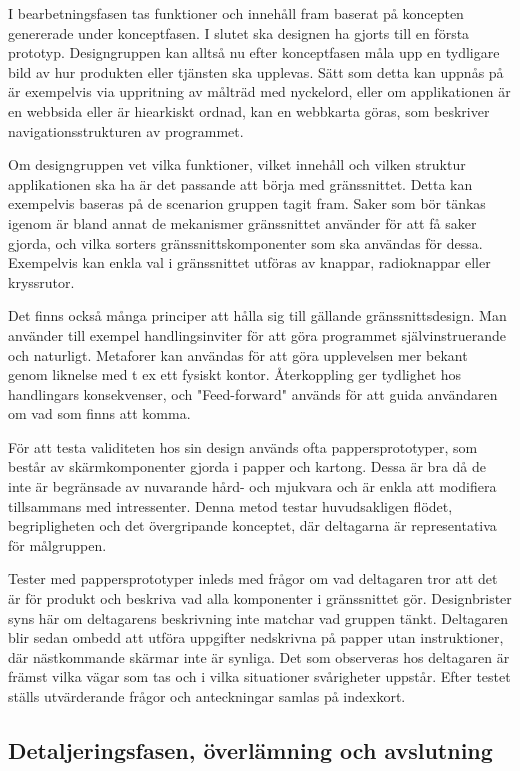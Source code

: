 \documentclass[a4paper,12pt,titlepage]{article}
\begin{document}
I bearbetningsfasen tas funktioner och innehåll fram baserat på koncepten genererade
under konceptfasen. I slutet ska designen ha gjorts till en första prototyp.
Designgruppen kan alltså nu efter konceptfasen måla upp en tydligare bild av
hur produkten eller tjänsten ska upplevas. Sätt som detta kan uppnås på är
exempelvis via uppritning av målträd med nyckelord, eller om applikationen är
en webbsida eller är hiearkiskt ordnad, kan en webbkarta göras, som beskriver
navigationsstrukturen av programmet.

Om designgruppen vet vilka funktioner, vilket innehåll och vilken struktur applikationen
ska ha är det passande att börja med gränssnittet. Detta kan exempelvis baseras
på de scenarion gruppen tagit fram. Saker som bör tänkas igenom är
bland annat de mekanismer gränssnittet använder för att få saker gjorda, och
vilka sorters gränssnittskomponenter som ska användas för dessa. Exempelvis kan
enkla val i gränssnittet utföras av knappar, radioknappar eller kryssrutor.

Det finns också många principer att hålla sig till gällande gränssnittsdesign.
Man använder till exempel handlingsinviter för att göra programmet
självinstruerande och naturligt. Metaforer kan användas för att göra
upplevelsen mer bekant genom liknelse med t ex ett fysiskt kontor. Återkoppling
ger tydlighet hos handlingars konsekvenser, och "Feed-forward" används för att
guida användaren om vad som finns att komma.

För att testa validiteten hos sin design används ofta pappersprototyper, som
består av skärmkomponenter gjorda i papper och kartong. Dessa är bra då de inte
är begränsade av nuvarande hård- och mjukvara och är enkla att modifiera
tillsammans med intressenter. Denna metod testar huvudsakligen flödet,
begripligheten och det övergripande konceptet, där deltagarna är representativa
för målgruppen.

Tester med pappersprototyper inleds med frågor om vad deltagaren tror att det är för
produkt och beskriva vad alla komponenter i gränssnittet gör. Designbrister
syns här om deltagarens beskrivning inte matchar vad gruppen tänkt. Deltagaren
blir sedan ombedd att utföra uppgifter nedskrivna på papper utan instruktioner,
där nästkommande skärmar inte är synliga. Det som observeras hos deltagaren är
främst vilka vägar som tas och i vilka situationer svårigheter uppstår. Efter
testet ställs utvärderande frågor och anteckningar samlas på indexkort.

\subsection*{Detaljeringsfasen, överlämning och avslutning}
\end{document}

